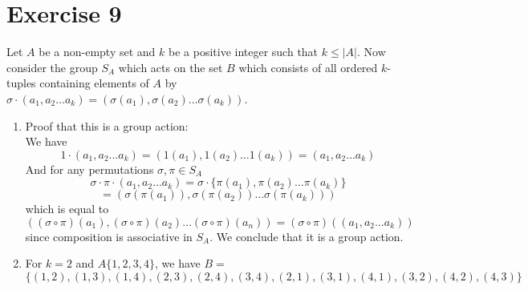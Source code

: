 \documentclass{article}
\begin{document}
    \section*{Exercise 9}
    Let $A$ be a non-empty set and $k$ be a positive integer
    such that $k \leqslant |A|$.
    Now consider the group $S_A$ which acts on the set $B$
    which consists of all ordered $k$-tuples containing elements of $A$
    by $\sigma \cdot (a_1, a_2 \dots a_k) =
    (\sigma(a_1), \sigma(a_2) \dots \sigma(a_k))$. \\
    \begin{enumerate}[label=\textbf{\alph*.}]
        \item 
            Proof that this is a group action: \\
            We have 
            \[ 1 \cdot (a_1, a_2 \dots a_k)
            = (1(a_1), 1(a_2) \dots 1(a_k))
            = (a_1, a_2 \dots a_k) \]
            And for any permutations $\sigma, \pi \in S_A$
            \[ \sigma \cdot \pi \cdot (a_1, a_2 \dots a_k)
            = \sigma \cdot \{\pi(a_1), \pi(a_2) \dots \pi(a_k)\} \]
            \[ = (\sigma(\pi(a_1)), \sigma(\pi(a_2))
            \dots \sigma(\pi(a_k))) \]
            which is equal to
            \[ ((\sigma \circ \pi)(a_1), (\sigma \circ \pi)(a_2)
            \dots (\sigma \circ \pi)(a_n))
            = (\sigma \circ \pi)((a_1, a_2 \dots a_k)) \] 
            since composition is associative in $S_A$. 
            We conclude that it is a group action.
        \item 
            For $k = 2$ and $A \{1, 2, 3, 4\}$,
            we have $B = $ 
            \[\{(1, 2), (1, 3), (1, 4), (2, 3), (2, 4),
            (3, 4), (2, 1), (3, 1), (4, 1), (3, 2), (4, 2),(4, 3)\} \]
\end{enumerate}
\end{document}
